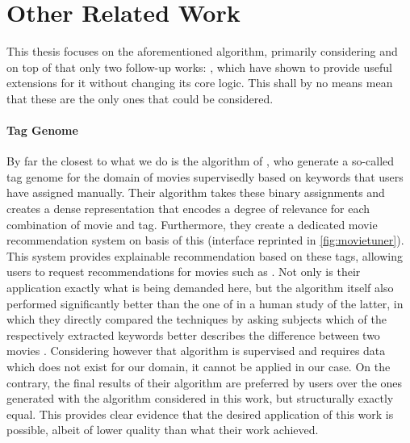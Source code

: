 


\section{Other Related Work}
\label{sec:otherwork}

This thesis focuses on the aforementioned algorithm, primarily considering \cite{Derrac2015} and on top of that only two follow-up works: \cite{Ager2018, Alshaikh2020}, which have shown to provide useful extensions for it without changing its core logic. This shall by no means mean that these are the only ones that could be considered.

\paragraph{Tag Genome} 

By far the closest to what we do is the algorithm of \textcite{VISR12}, who generate a so-called tag genome for the domain of movies supervisedly based on keywords that users have assigned manually. Their algorithm takes these binary assignments and creates a dense representation that encodes a degree of relevance for each combination of movie and tag. Furthermore, they create a dedicated movie recommendation system on basis of this (interface reprinted in \autoref{fig:movietuner}). This system provides explainable recommendation based on these tags, allowing users to request recommendations for movies such as \textit{} \cite[3]{VISR12}. Not only is their application exactly what is being demanded here, but the algorithm itself also performed significantly better than the one of \textcite{Derrac2015} in a human study of the latter, in which they directly compared the techniques by asking subjects which of the respectively extracted keywords better describes the difference between two movies \cite[44]{Derrac2015}. Considering however that  algorithm is supervised and requires data which does not exist for our domain, it cannot be applied in our case. On the contrary, the final results of their algorithm are preferred by users over the ones generated with the algorithm considered in this work, but structurally exactly equal. This provides clear evidence that the desired application of this work is possible, albeit of lower quality than what their work achieved.

